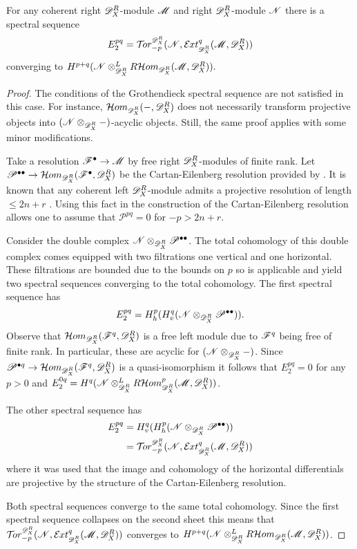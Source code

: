  \begin{proposition}\label{prop: SpectralTorExt}
   For any coherent right $\mathscr{D}_X^R$-module $\mathscr{M}$ and right $\mathscr{D}_X^R$-module $\mathscr{N}$ there is a spectral sequence
   $$E_2^{pq}= \Tr{\D_X^R}{-p}(\N,\Ex{\D_X^R}{q}(\M,\D_X^R)) $$
   converging to $H^{p+q} (\mathscr{N}\otimes_{\mathscr{D}_X^R}^L R\mathcal{H}om_{\mathscr{D}_X^R}(\mathscr{M},\mathscr{D}_X^R) ).$
 \end{proposition}
 \begin{proof}
   The conditions of the Grothendieck spectral sequence  are not satisfied in this case.
   For instance, $\Hom_{\sc{\D_X^R}}(\blank,\D_X^R)$ does not necessarily transform projective objects into $(\mathscr{N}\otimes_{\mathscr{D}_X^R}{-})$-acyclic objects.
   Still, the same proof applies with some minor modifications.

  Take a resolution $\mathscr{F}^\bullet \to \mathscr{M}$ by free right $\mathscr{D}_X^R$-modules of finite rank.
  Let $\mathscr{P}^{\bullet\bullet}\to \mathcal{H}om_{\mathscr{D}_X^R}(\mathscr{F}^{\bullet},\mathscr{D}_X^R)$ be the Cartan-Eilenberg resolution provided by .
  It is known that any coherent left $\mathscr{D}_X^R$-module admits a projective resolution of length $\leq 2n + r$ \cite[p6]{budur2020zeroI}.
  Using this fact in the construction of the Cartan-Eilenberg resolution allows one to assume that $\mathscr{P}^{pq}=0$ for $-p>2n + r$.

  Consider the double complex $\mathscr{N}\otimes_{\mathscr{D}_X^R}\mathscr{P}^{\bullet \bullet}$.
  The total cohomology of this double complex comes equipped with two filtrations one vertical and one horizontal.
  These filtrations are bounded due to the bounds on $p$ so  is applicable and yield two spectral sequences converging to the total cohomology.
  The first spectral sequence has
  $$E_{2}^{pq} = H^p_h(H^q_v(\mathscr{N} \otimes_{\mathscr{D}_X^R}\mathscr{P}^{\bullet \bullet})).$$
  Observe that $\mathcal{H}om_{\mathscr{D}_X^R}(\mathscr{F}^q, \mathscr{D}_X^R)$ is a free left module due to $\mathscr{F}^q$ being free of finite rank.
  In particular, these are acyclic for $(\mathscr{N}\otimes_{\mathscr{D}_X^R}{-})$.
  Since $\mathscr{P}^{\bullet q}\to \mathcal{H}om_{\mathscr{D}_X^R}(\mathscr{F}^q,\mathscr{D}_X^R)$ is a quasi-isomorphism it follows that $E_2^{pq}=0$ for any $p>0$ and $E_2^{0q} = H^{q} (\mathscr{N}\otimes_{\mathscr{D}_X^R}^LR\mathcal{H}om_{\mathscr{D}_X^R}^p(\mathscr{M},\mathscr{D}_X^R) )$.

  The other spectral sequence has
  \begin{align*}
      E_2^{pq} &= H^q_v(H^p_h(\N\otimes_{\D_X^R}\mathscr{P}^{\bullet\bullet}))\\
      &=  \Tr{\D_X^R}{-p}(\N,\Ex{\D_X^R}{q}(\M,\D_X^R))
  \end{align*}
  where it was used that the image and cohomology of the horizontal differentials are projective by the structure of the Cartan-Eilenberg resolution.

  Both spectral sequences converge to the same total cohomology.
  Since the first spectral sequence collapses on the second sheet this means that $\Tr{\D_X^R}{-p}(\N,\Ex{\D_X^R}{q}(\M,\D_X^R))$ converges to $H^{p+q}( \mathscr{N}\otimes_{\mathscr{D}_X^R}^LR\mathcal{H}om_{\mathscr{D}_X^R}(\mathscr{M},\mathscr{D}_X^R) )$.
 \end{proof}

